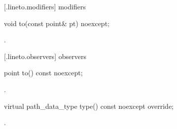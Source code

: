  [\iotwod.lineto.modifiers]{ modifiers}

\begin{itemdecl}
    void to(const point& pt) noexcept;
\end{itemdecl}
\begin{itemdescr}
	\pnum
	\postconditions
	.
	
\end{itemdescr}

 [\iotwod.lineto.observers]{ observers}

\begin{itemdecl}
    point to() const noexcept;
\end{itemdecl}
\begin{itemdescr}
	\pnum
	\returns
	.

\end{itemdescr}

\begin{itemdecl}
    virtual path_data_type type() const noexcept override;
\end{itemdecl}
\begin{itemdescr}
	\pnum
	\returns
	.

\end{itemdescr}
